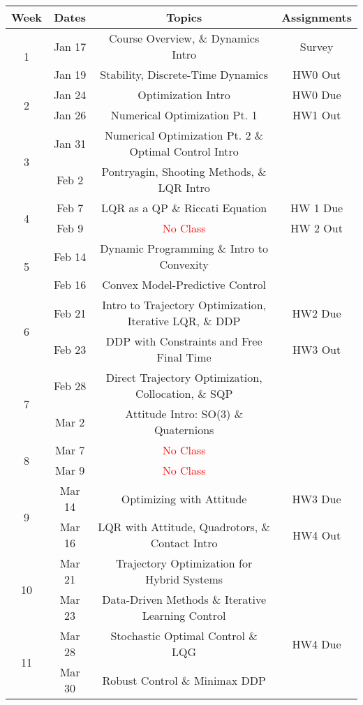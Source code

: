 \documentclass[11pt,letterpaper]{article}
\begin{document}
\begin{tabular}{c|c|c|c}
	Week & Dates & Topics & Assignments \\
	\hline
	\multirow{2}{*}{1} & Jan 17 & Course Overview, \& Dynamics Intro & Survey \\
	 & Jan 19 & Stability, Discrete-Time Dynamics &  HW0 Out\\
	\hline
	\multirow{2}{*}{2} & Jan 24 & Optimization Intro & HW0 Due \\
	 & Jan 26 & Numerical Optimization Pt. 1 & HW1 Out \\
	\hline
	\multirow{2}{*}{3}  & Jan 31 & Numerical Optimization Pt. 2 \& Optimal Control Intro &  \\
	 & Feb 2 & Pontryagin, Shooting Methods, \& LQR Intro &  \\
	\hline
	\multirow{2}{*}{4}  & Feb 7 & LQR as a QP \& Riccati Equation & HW 1 Due \\
	 & Feb 9 & \textcolor{red}{No Class} & HW 2 Out \\
	\hline
	\multirow{2}{*}{5}  & Feb 14 & Dynamic Programming \& Intro to Convexity & \\
	 & Feb 16 & Convex Model-Predictive Control &  \\
	\hline
	\multirow{2}{*}{6}  & Feb 21 & Intro to Trajectory Optimization, Iterative LQR, \& DDP & HW2 Due \\
	 & Feb 23 & DDP with Constraints and Free Final Time & HW3 Out \\
	\hline
	\multirow{2}{*}{7}  & Feb 28 & Direct Trajectory Optimization, Collocation, \& SQP & \\
	 & Mar 2 & Attitude Intro: SO(3) \& Quaternions & \\
	\hline
	\multirow{2}{*}{8}  & Mar 7 & \textcolor{red}{No Class} & \\
	 & Mar 9 & \textcolor{red}{No Class} &   \\
	\hline
	\multirow{2}{*}{9}  & Mar 14 & Optimizing with Attitude & HW3 Due \\
	 & Mar 16 & LQR with Attitude, Quadrotors, \& Contact Intro & HW4 Out \\
	\hline
	\multirow{2}{*}{10}  & Mar 21 & Trajectory Optimization for Hybrid Systems &  \\
	 & Mar 23 & Data-Driven Methods \& Iterative Learning Control &   \\
	 \hline
	\multirow{2}{*}{11}  & Mar 28 & Stochastic Optimal Control \& LQG & HW4 Due \\
	 & Mar 30 & Robust Control \& Minimax DDP &   \\

\end{tabular}
\end{document}
